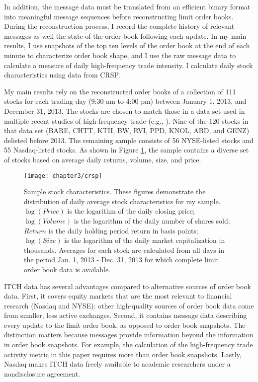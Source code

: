 	In addition, the message data must be translated from an efficient binary format into meaningful message sequences before reconstructing limit order books. During the reconstruction process, I record the complete history of relevant messages as well the state of the order book following each update. In my main results, I use snapshots of the top ten levels of the order book at the end of each minute to characterize order book shape, and I use the raw message data to calculate a measure of daily high-frequency trade intensity. I calculate daily stock characteristics using data from CRSP.

	My main results rely on the reconstructed order books of a collection of 111 stocks for each trading day (9:30 am to 4:00 pm) between January 1, 2013, and December 31, 2013. The stocks are chosen to match those in a data set used in multiple recent studies of high-frequency trade (e.g., \citet{Brogaard2014}). Nine of the 120 stocks in that data set (BARE, CHTT, KTII, BW, RVI, PPD, KNOL, ABD, and GENZ) delisted before 2013. The remaining sample consists of 56 NYSE-listed stocks and 55 Nasdaq-listed stocks. As shown in Figure \ref{fig:crsp}, the sample contains a diverse set of stocks based on average daily returns, volume, size, and price.


	\begin{figure}[p]
		\small
		\linespread{1}
		\centering
		\texttt{[image: chapter3/crsp]}
		\captionsetup{skip=-20pt, position=below, font=footnotesize, justification=justified, width=\linewidth}
		\caption[Sample stock characteristics]{Sample stock characteristics. These figures demonstrate the distribution of daily average stock characteristics for my sample. $\log(Price)$ is the logarithm of the daily closing price; $\log(Volume)$ is the logarithm of the daily number of shares sold; $Return$ is the daily holding period return in basis points; $\log(Size)$ is the logarithm of the daily market capitalization in thousands. Averages for each stock  are calculated from all days in the period Jan. 1, 2013 - Dec. 31, 2013 for which complete limit order book data is available.}
		\label{fig:crsp}
	\end{figure}


	ITCH data has several advantages compared to alternative sources of order book data. First, it covers equity markets that are the most relevant to financial research (Nasdaq and NYSE): other high-quality sources of order book data come from smaller, less active exchanges. Second, it contains message data describing every update to the limit order book, as opposed to order book snapshots. The distinction matters because messages provide information beyond the information in order book snapshots. For example, the calculation of the high-frequency trade activity metric in this paper requires more than order book snapshots. Lastly, Nasdaq makes ITCH data freely available to academic researchers under a nondisclosure agreement.

